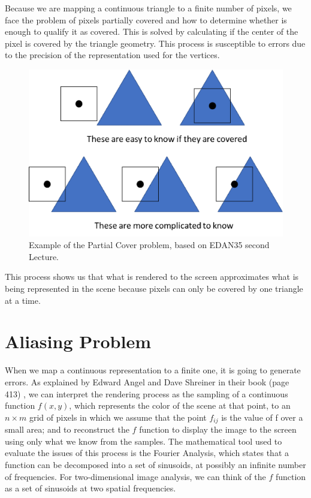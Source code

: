 \documentclass{cslthse-msc}
\begin{document}
Because we are mapping a continuous triangle to a finite number of pixels, we face the problem of pixels partially covered and how to determine whether is enough to qualify it as covered. This is solved by calculating if the center of the pixel is covered by the triangle geometry. This process is susceptible to errors due to the precision of the representation used for the vertices.  

\begin{figure}[!hbt]
	\centering
	\includegraphics[scale=0.5]{images/edge_testing.png} 
	\caption{Example of the Partial Cover problem, based on EDAN35 second Lecture. ~\cite{Doggett2017EDAN35}}\label{fig:partialcover}
\end{figure}

This process shows us that what is rendered to the screen approximates what is being represented in the scene because pixels can only be covered by one triangle at a time. \cite{Moller2007, Doggett2017EDAN35}

\section{Aliasing Problem}
When we map a continuous representation to a finite one, it is going to generate errors. As explained by Edward Angel and Dave Shreiner in their book (page 413) \cite{Shreiner2011}, we can interpret the rendering process as the sampling of a continuous function $f(x, y)$, which represents the color of the scene at that point, to an $n\times m$  grid of pixels in which we assume that the point $f_{ij}$  is the value of f over a small area; and to reconstruct the $f$ function to display the image to the screen using only what we know from the samples. The mathematical tool used to evaluate the issues of this process is the Fourier Analysis, which states that a function can be decomposed into a set of sinusoids, at possibly an infinite number of frequencies. For two-dimensional image analysis, we can think of the $f$ function as a set of sinusoids at two spatial frequencies.
\end{document}

